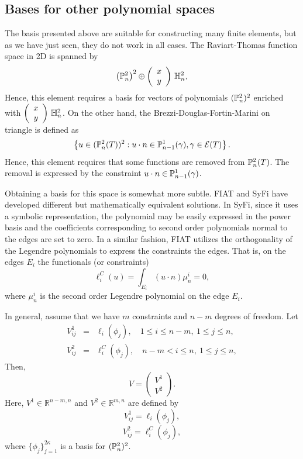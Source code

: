 \subsection{Bases for other polynomial spaces}
The basis presented above are suitable for constructing many finite
elements, but as we have just seen, they do not work in all cases.
The Raviart-Thomas function space in 2D is spanned by
\[
\left( \P^2_n \right)^2 \oplus
\left(\begin{array}{c} x \\y \end{array} \right) \, \H^2_n, 
\]
Hence, this element requires a basis for vectors of polynomials  $(\P^2_n)^2$  enriched with 
$ \left(\begin{array}{c} x \\y \end{array} \right)  \, \H^2_n$.
On the other hand,  the Brezzi-Douglas-Fortin-Marini on triangle is defined as  
\begin{equation}
\left\{
u \in (\P^2_n (T) )^2 : u \cdot n \in \P^1_{n-1}(\gamma), \gamma \in \mathcal{E}(T)
\right\}.
\end{equation}
Hence, this element requires that some functions are removed from   
$\P^2_n (T)$. The removal is expressed by the constraint  $u \cdot n \in \P^1_{n-1}(\gamma)$.

Obtaining a basis for this space is somewhat more subtle.  
FIAT and SyFi have developed different
but mathematically equivalent solutions.  
In SyFi, since it uses a symbolic representation, the polynomial may be easily expressed 
in the power basis and the coefficients corresponding to second order polynomials 
normal to the edges are set to zero. In a similar fashion, FIAT utilizes the orthogonality of the Legendre polynomials  
 to express the constraints the edges. That is, on the edges $E_i$ the functionals (or constraints)    
\[
\ell^C_i( u ) = \int_{E_i} (u \cdot n) \mu_n^i = 0,  
\]
where $\mu_n^i$ is the second order Legendre polynomial on the edge $E_i$.  


In general, assume that we have $m$ constraints and $n-m$ degrees of freedom.
Let 
\begin{eqnarray}
V^1_{ij} &=& \ell_i( \phi_j ), \quad  1\le i \le n-m, \  1\le j \le n,  \\
V^2_{ij} &=& \ell^C_i( \phi_j ), \quad  n-m  < i \le n, \  1\le j \le n, 
\end{eqnarray}
Then,
\begin{equation}
V = \left( \begin{array}{c} V^1 \\ V^2 \end{array} \right).
\end{equation}
Here, \( V^1 \in \mathbb{R}^{n-m, n} \) and
\( V^2 \in \mathbb{R}^{m, n} \) are defined
by
\[V^1_{ij} = \ell_i( \phi_j ),
\]
\[
V^2_{ij} = \ell^C_i( \phi_j ),
\]
where \( \{ \phi_j \}_{j=1}^{2 \kappa} \) is a basis for \( (\P^2_n)^2
\).

